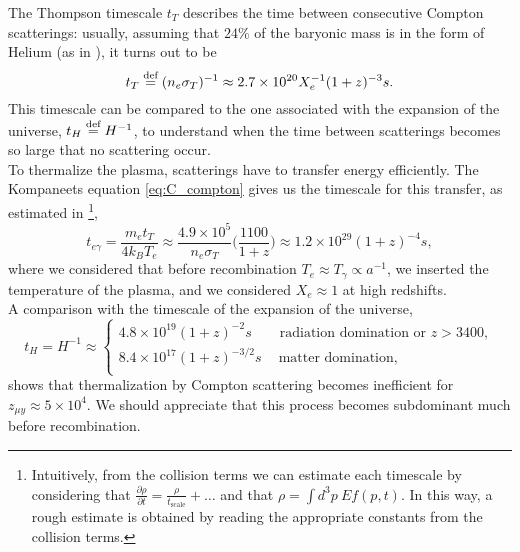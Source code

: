 The Thompson timescale $t_T$ describes the time between consecutive Compton scatterings: usually, assuming that $24\%$ of the baryonic mass is in the form of Helium (as in \cite{chlubafuturestepscosmologyusing}), it turns out to be $$t_T\stackrel{\text{def}}{=}(n_e\sigma_T)^{-1}\approx2.7\times10^{20}X_e^{-1}(1+z)^{-3}s.$$ This timescale can be compared to the one associated with the expansion of the universe, $t_H\stackrel{\text{def}}{=} H^{-1}$, to understand when the time between scatterings becomes so large that no scattering occur.\\
To thermalize the plasma, scatterings have to transfer energy efficiently. The Kompaneets equation \eqref{eq:C_compton} gives us the timescale for this transfer, as estimated in \cite{chlubafuturestepscosmologyusing}\footnote{Intuitively, from the collision terms we can estimate each timescale by considering that $\frac{\partial\rho}{\partial t}=\frac{\rho}{t_\text{scale}}+\dots$ and that $\rho=\int d^3p\ Ef(p,t)$. In this way, a rough estimate is obtained by reading the appropriate constants from the collision terms.},
$$ t_{e\gamma}=\frac{m_et_T}{4k_BT_e}\approx\frac{4.9\times10^{5}}{n_e\sigma_T}\bigg(\frac{1100}{1+z}\bigg)\approx1.2\times10^{29}(1+z)^{-4}s,$$ 
where we considered that before recombination $T_e\approx T_\gamma\propto a^{-1}$, we inserted the temperature of the plasma, and we considered $X_e\approx 1$ at high redshifts.\\ A comparison with the timescale of the expansion of the universe,
$$t_H=H^{-1}\approx\begin{cases}
    4.8\times10^{19}(1+z)^{-2}s\qquad\text{radiation domination or } z>3400,\\
    8.4\times10^{17}(1+z)^{-3/2}s\quad\ \text{matter domination} ,\\
\end{cases}$$ 
shows that thermalization by Compton scattering becomes inefficient for $z_{\mu y}\approx5\times10^4$. We should appreciate that this process becomes subdominant much before recombination.

